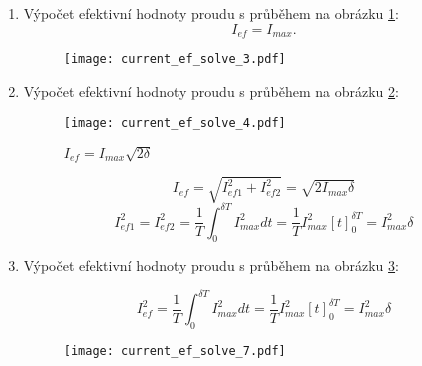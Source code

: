\begin{enumerate}
      \item Výpočet efektivní hodnoty proudu s průběhem na obrázku \ref{es:fig_current_ef_solve_3}:
          \begin{equation}\label{ES_eq_solve3}
            I_{ef} = I_{max}.
          \end{equation}
          \begin{figure}
            \centering
            \texttt{[image: current\_ef\_solve\_3.pdf]}
            \caption{ }
            \label{es:fig_current_ef_solve_3}
          \end{figure}
        
      \item Výpočet efektivní hodnoty proudu s průběhem na obrázku \ref{es:fig_current_ef_solve_4}:
        \begin{figure}[ht!]
          \centering
          \texttt{[image: current\_ef\_solve\_4.pdf]}
          \caption{$I_{ef}=I_{max}\sqrt{2\delta}$}\label{es:fig_current_ef_solve_4}
        \end{figure}
        \begin{equation}\label{es:eq_Ief4_solve}
            I_{ef}=\sqrt{I_{ef1}^2+I_{ef2}^2}=\sqrt{2I_{max}\delta}
        \end{equation}
        \begin{equation}\label{es:eq_Ief4}
            I_{ef1}^2=I_{ef2}^2=\frac{1}{T}\int_0^{\delta T}{I_{max}^2}dt
                               =\frac{1}{T}I_{max}^2[t]_0^{\delta T}=I_{max}^2\delta
        \end{equation}

      \item Výpočet efektivní hodnoty proudu s průběhem na obrázku \ref{es:fig_current_ef_solve_7}:

          \begin{equation}\label{es:eq_current_ef_solve_7}
            I_{ef}^2 = \frac{1}{T}\int_0^{\delta T}{I_{max}^2}dt 
                     = \frac{1}{T}I_{max}^2[t]_0^{\delta T}=I_{max}^2\delta
          \end{equation}

          \begin{figure}
            \centering
            \texttt{[image: current\_ef\_solve\_7.pdf]}
            \caption{ }
            \label{es:fig_current_ef_solve_7}
          \end{figure}
        

\end{enumerate}
